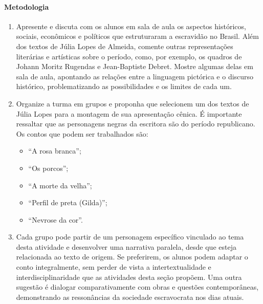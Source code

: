 \documentclass[12pt]{extarticle}
\begin{document}
\paragraph{Metodologia}

\begin{enumerate}

\item
Apresente e discuta com os alunos em sala de
aula os aspectos históricos, sociais, econômicos e políticos que
estruturaram a escravidão no Brasil. Além dos textos de Júlia Lopes de
Almeida, comente outras representações literárias e artísticas sobre o
período, como, por exemplo, os quadros de Johann Moritz Rugendas e
Jean-Baptiste Debret. Mostre algumas delas em sala de aula, apontando as
relações entre a linguagem pictórica e o discurso histórico,
problematizando as possibilidades e os limites de cada um.






\item
Organize a turma em grupos e proponha que selecionem um dos textos de
Júlia Lopes para a montagem de sua apresentação cênica. É importante
ressaltar que as personagens negras da escritora são do período
republicano. Os contos que podem ser trabalhados são:

\begin{itemize}
\item
  ``A rosa branca'';
\item
  ``Os porcos'';
\item
  ``A morte da velha'';
\item
  ``Perfil de preta (Gilda)'';
\item
  ``Nevrose da cor''.
\end{itemize}

\item
Cada grupo pode partir de um personagem específico vinculado ao tema
desta atividade e desenvolver uma narrativa paralela, desde que esteja
relacionada ao texto de origem. Se preferirem, os alunos podem adaptar o
conto integralmente, sem perder de vista a
intertextualidade e interdisciplinaridade que as atividades desta seção
propõem. Uma outra sugestão é dialogar comparativamente com obras e
questões contemporâneas, demonstrando as ressonâncias da sociedade
escravocrata nos dias atuais.


\end{enumerate}
\end{document}
